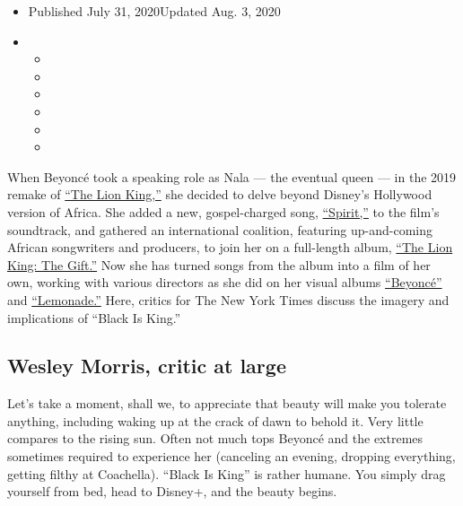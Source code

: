 \begin{itemize}
\item
  Published July 31, 2020Updated Aug. 3, 2020
\item
  \begin{itemize}
  \item
  \item
  \item
  \item
  \item
  \item
  \end{itemize}
\end{itemize}

When Beyoncé took a speaking role as Nala --- the eventual queen --- in
the 2019 remake of
\href{https://www.nytimes3xbfgragh.onion/2019/07/11/movies/the-lion-king-review.html}{``The
Lion King,''} she decided to delve beyond Disney's Hollywood version of
Africa. She added a new, gospel-charged song,
\href{https://www.nytimes3xbfgragh.onion/2019/07/12/arts/music/playlist-beyonce-billie-eilish-justin-bieber-ed-sheeran.html}{``Spirit,''}
to the film's soundtrack, and gathered an international coalition,
featuring up-and-coming African songwriters and producers, to join her
on a full-length album,
\href{https://www.nytimes3xbfgragh.onion/2019/07/24/arts/music/beyonce-the-lion-king-the-gift-review.html}{``The
Lion King: The Gift.''} Now she has turned songs from the album into a
film of her own, working with various directors as she did on her visual
albums
\href{https://www.nytimes3xbfgragh.onion/2013/12/14/arts/music/beyonces-new-album-is-steamy-and-sleek.html}{``Beyoncé''}
and
\href{https://www.nytimes3xbfgragh.onion/2016/04/25/arts/music/beyonce-lemonade.html}{``Lemonade.''}
Here, critics for The New York Times discuss the imagery and
implications of ``Black Is King.''

\hypertarget{wesley-morris-critic-at-large}{%
\subsection{Wesley Morris, critic at
large}\label{wesley-morris-critic-at-large}}

Let's take a moment, shall we, to appreciate that beauty will make you
tolerate anything, including waking up at the crack of dawn to behold
it. Very little compares to the rising sun. Often not much tops Beyoncé
and the extremes sometimes required to experience her (canceling an
evening, dropping everything, getting filthy at Coachella). ``Black Is
King'' is rather humane. You simply drag yourself from bed, head to
Disney+, and the beauty begins.

